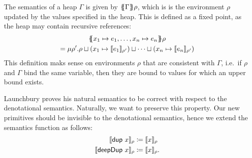 \documentclass[preprint]{sigplanconf}
\theoremstyle{nonumberplain}
\begin{document}
The semantics of a heap $\Gamma$ is given by $\{\!\!\{\Gamma\}\!\!\} \rho$, which is is the environment $\rho$ updated by the values specified in the heap. This is defined as a fixed point, as the heap may contain recursive references:
\begin{multline*}
\{\!\!\{ x_1\mapsto e_1,\ldots,x_n\mapsto e_n\}\!\!\}\rho \\
= \mu \rho'. \rho \sqcup (x_1 \mapsto \llbracket e_1 \rrbracket_{\rho'}) \sqcup \cdots \sqcup (x_n \mapsto \llbracket e_n \rrbracket_{\rho'})
\end{multline*}
This definition maks sense on environments $\rho$ that are consistent with $\Gamma$, i.e.\ if $\rho$ and $\Gamma$ bind the same variable, then they are bound to values for which an upper bound exists.

Launchbury proves his natural semantics to be correct with respect to the denotational semantics. 
Naturally, we want to preserve this property. Our new primitives should be invisible to the denotational semantics, hence we extend the semantics function as follows:
\begin{align*}
\llbracket \text{\textsf{dup}}\ x \rrbracket_{\rho} &\coloneqq \llbracket x \rrbracket_{\rho} \\
\llbracket \text{\textsf{deepDup}}\ x \rrbracket_{\rho} &\coloneqq \llbracket x \rrbracket_{\rho}.
\end{align*}
\end{document}
